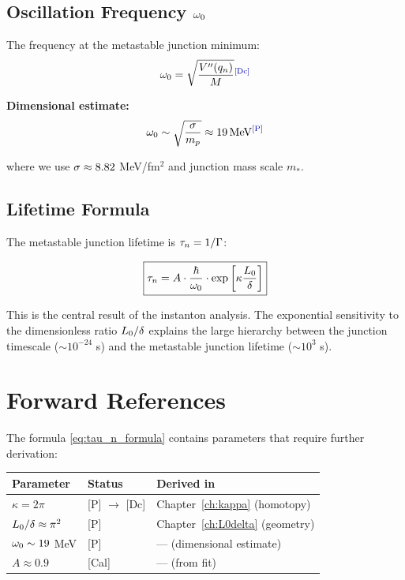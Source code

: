 \subsection{Oscillation Frequency $\omega_0$}

The frequency at the metastable junction minimum:
\begin{equation}
    \omegaz = \sqrt{\frac{V''(q_n)}{M}}
    \tagDc
\end{equation}

\textbf{Dimensional estimate:}
\begin{equation}
    \omegaz \sim \sqrt{\frac{\bsigma}{m_p}} \approx 19 \MeV
    \tagP
\end{equation}

where we use $\sigma \approx 8.82$ MeV/fm$^2$ and junction mass scale $m_*$.

\subsection{Lifetime Formula}

The metastable junction lifetime is $\tau_n = 1/\Gamma$:

\begin{resultbox}[title=Metastable Lifetime Formula]
    \begin{equation}
        \boxed{\tau_n = A \cdot \frac{\hbar}{\omega_0} \cdot \exp\left[\kappa \frac{L_0}{\delta}\right]}
        \label{eq:tau_n_formula}
    \end{equation}
    \tagDer
\end{resultbox}

This is the central result of the instanton analysis. The exponential
sensitivity to the dimensionless ratio $L_0/\delta$ explains the large
hierarchy between the junction timescale ($\sim 10^{-24}$ s) and the metastable junction
lifetime ($\sim 10^3$ s).

\section{Forward References}
\label{sec:instanton:forward}

The formula \eqref{eq:tau_n_formula} contains parameters that require
further derivation:

\begin{center}
\begin{tabular}{lll}
\toprule
\textbf{Parameter} & \textbf{Status} & \textbf{Derived in} \\
\midrule
$\kappa = 2\pi$ & [P] $\to$ [Dc] & Chapter~\ref{ch:kappa} (homotopy) \\
$L_0/\delta \approx \pi^2$ & [P] & Chapter~\ref{ch:L0delta} (geometry) \\
$\omega_0 \sim 19$ MeV & [P] & — (dimensional estimate) \\
$A \approx 0.9$ & [Cal] & — (from fit) \\
\bottomrule
\end{tabular}
\end{center}

